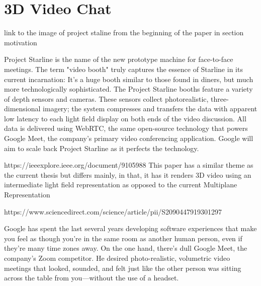 \section{3D Video Chat}\label{sec:3d-video-chat} 


link to the image of project staline from the beginning of the paper in section motivation 


Project Starline is the name of the new prototype machine for face-to-face meetings. The term "video booth" truly captures the essence of Starline in its current incarnation: It's a huge booth similar to those found in diners, but much more technologically sophisticated. The Project Starline booths feature a variety of depth sensors and cameras. These sensors collect photorealistic, three-dimensional imagery; the system compresses and transfers the data with apparent low latency to each light field display on both ends of the video discussion. All data is delivered using WebRTC, the same open-source technology that powers Google Meet, the company's primary video conferencing application. Google will aim to scale back Project Starline as it perfects the technology.



https://ieeexplore.ieee.org/document/9105988
This paper has a similar theme as the current thesis but differs mainly, in that, it has it renders 3D video using an intermediate light field representation as opposed to the current Multiplane Representation

https://www.sciencedirect.com/science/article/pii/S2090447919301297



Google has spent the last several years developing software experiences that make you feel as though you're in the same room as another human person, even if they're many time zones away. On the one hand, there's dull Google Meet, the company's Zoom competitor. He desired photo-realistic, volumetric video meetings that looked, sounded, and felt just like the other person was sitting across the table from you—without the use of a headset.

